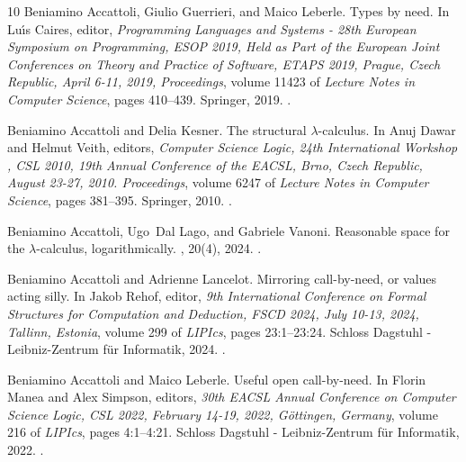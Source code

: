 \documentclass[10pt,a4paper]{article}
\theoremstyle{remark}
\begin{document}
\begin{thebibliography}{10}
Beniamino Accattoli, Giulio Guerrieri, and Maico Leberle.
\newblock Types by need.
\newblock In Lu{\'{\i}}s Caires, editor, {\em Programming Languages and Systems
  - 28th European Symposium on Programming, {ESOP} 2019, Held as Part of the
  European Joint Conferences on Theory and Practice of Software, {ETAPS} 2019,
  Prague, Czech Republic, April 6-11, 2019, Proceedings}, volume 11423 of {\em
  Lecture Notes in Computer Science}, pages 410--439. Springer, 2019.
\newblock \href {https://doi.org/10.1007/978-3-030-17184-1\_15}
  {}.

Beniamino Accattoli and Delia Kesner.
\newblock The structural $\lambda$-calculus.
\newblock In Anuj Dawar and Helmut Veith, editors, {\em Computer Science Logic,
  24th International Workshop , {CSL} 2010, 19th Annual Conference of the
  EACSL, Brno, Czech Republic, August 23-27, 2010. Proceedings}, volume 6247 of
  {\em Lecture Notes in Computer Science}, pages 381--395. Springer, 2010.
\newblock \href {https://doi.org/10.1007/978-3-642-15205-4\_30}
  {}.

Beniamino Accattoli, Ugo~Dal Lago, and Gabriele Vanoni.
\newblock Reasonable space for the {\(\lambda\)}-calculus, logarithmically.
, 20(4), 2024.
\newblock \href {https://doi.org/10.46298/LMCS-20(4:15)2024}
  {}.

Beniamino Accattoli and Adrienne Lancelot.
\newblock Mirroring call-by-need, or values acting silly.
\newblock In Jakob Rehof, editor, {\em 9th International Conference on Formal
  Structures for Computation and Deduction, {FSCD} 2024, July 10-13, 2024,
  Tallinn, Estonia}, volume 299 of {\em LIPIcs}, pages 23:1--23:24. Schloss
  Dagstuhl - Leibniz-Zentrum f{\"{u}}r Informatik, 2024.
\newblock \href {https://doi.org/10.4230/LIPICS.FSCD.2024.23}
  {}.

Beniamino Accattoli and Maico Leberle.
\newblock Useful open call-by-need.
\newblock In Florin Manea and Alex Simpson, editors, {\em 30th {EACSL} Annual
  Conference on Computer Science Logic, {CSL} 2022, February 14-19, 2022,
  G{\"{o}}ttingen, Germany}, volume 216 of {\em LIPIcs}, pages 4:1--4:21.
  Schloss Dagstuhl - Leibniz-Zentrum f{\"{u}}r Informatik, 2022.
\newblock \href {https://doi.org/10.4230/LIPICS.CSL.2022.4}
  {}.


\end{thebibliography}
\end{document}
